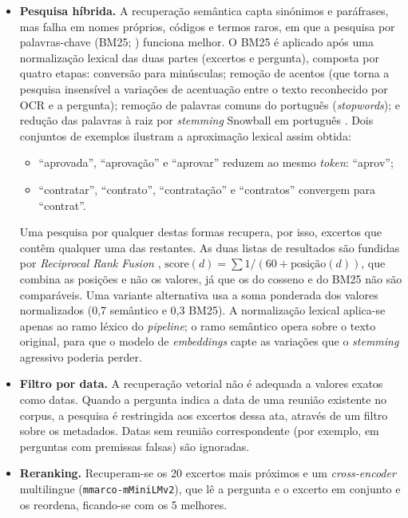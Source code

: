 \documentclass[11pt]{article}
\renewcommand{\_}{\textunderscore\allowbreak}
\begin{document}
\begin{itemize}
    \item \textbf{Pesquisa híbrida.} A recuperação semântica capta sinónimos e paráfrases, mas falha em nomes próprios, códigos e termos raros, em que a pesquisa por palavras-chave (BM25; \cite{bm25}) funciona melhor. O BM25 é aplicado após uma normalização lexical das duas partes (excertos e pergunta), composta por quatro etapas: conversão para minúsculas; remoção de acentos (que torna a pesquisa insensível a variações de acentuação entre o texto reconhecido por OCR e a pergunta); remoção de palavras comuns do português (\textit{stopwords}); e redução das palavras à raiz por \textit{stemming} Snowball em português \cite{snowball}. Dois conjuntos de exemplos ilustram a aproximação lexical assim obtida: 
    \begin{itemize}
    \item ``aprovada'', ``aprovação'' e ``aprovar'' reduzem ao mesmo \textit{token}: ``aprov'';
    \item ``contratar'', ``contrato'', ``contratação'' e ``contratos'' convergem para ``contrat''.
\end{itemize}

\noindent Uma pesquisa por qualquer destas formas recupera, por isso, excertos que contêm qualquer uma das restantes. As duas listas de resultados são fundidas por \textit{Reciprocal Rank Fusion} \cite{rrf}, $\mathrm{score}(d) = \sum 1/(60 + \mathrm{posição}(d))$, que combina as posições e não os valores, já que os do cosseno e do BM25 não são comparáveis. Uma variante alternativa usa a soma ponderada dos valores normalizados (0,7 semântico e 0,3 BM25). A normalização lexical aplica-se apenas ao ramo léxico do \textit{pipeline}; o ramo semântico opera sobre o texto original, para que o modelo de \textit{embeddings} capte as variações que o \textit{stemming} agressivo poderia perder.
    \item \textbf{Filtro por data.} A recuperação vetorial não é adequada a valores exatos como datas. Quando a pergunta indica a data de uma reunião existente no corpus, a pesquisa é restringida aos excertos dessa ata, através de um filtro sobre os metadados. Datas sem reunião correspondente (por exemplo, em perguntas com premissas falsas) são ignoradas.
    \item \textbf{Reranking.} Recuperam-se os 20 excertos mais próximos e um \textit{cross-encoder} multilingue (\texttt{mmarco-\allowbreak mMiniLMv2}), que lê a pergunta e o excerto em conjunto e os reordena, ficando-se com os 5 melhores.
\end{itemize}
\end{document}
